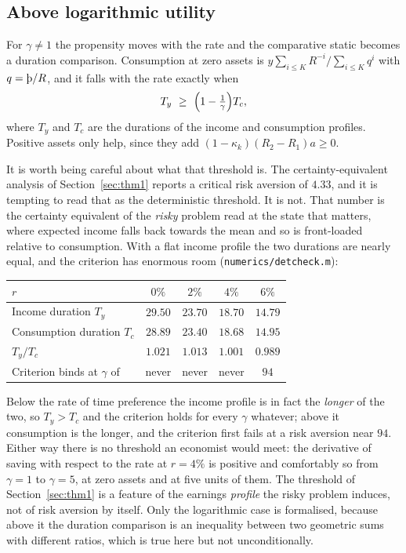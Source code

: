 \subsection{Above logarithmic utility}

For $\gamma\ne1$ the propensity moves with the rate and the comparative static becomes a duration
comparison. Consumption at zero assets is $y\sum_{i\le K}R^{-i}\big/\sum_{i\le K}q^i$ with
$q=\Thorn/R$, and it falls with the rate exactly when
\[
  T_y\ \ge\ \Bigl(1-\tfrac1\gamma\Bigr)T_c ,
\]
where $T_y$ and $T_c$ are the durations of the income and consumption profiles. Positive assets
only help, since they add $(1-\kappa_k)(R_2-R_1)a\ge0$.

It is worth being careful about what that threshold is. The certainty-equivalent analysis of
Section~\ref{sec:thm1} reports a critical risk aversion of $4.33$, and it is tempting to read that
as the deterministic threshold. It is not. That number is the certainty equivalent of the
\emph{risky} problem read at the state that matters, where expected income falls back towards the
mean and so is front-loaded relative to consumption. With a flat income profile the two durations
are nearly equal, and the criterion has enormous room (\texttt{numerics/detcheck.m}):

\begingroup\small
\begin{center}
\begin{tabular}{@{}lcccc@{}}
\toprule
$r$ & $0\%$ & $2\%$ & $4\%$ & $6\%$\\
\midrule
Income duration $T_y$ & $29.50$ & $23.70$ & $18.70$ & $14.79$\\
Consumption duration $T_c$ & $28.89$ & $23.40$ & $18.68$ & $14.95$\\
$T_y/T_c$ & $1.021$ & $1.013$ & $1.001$ & $0.989$\\
Criterion binds at $\gamma$ of & never & never & never & $94$\\
\bottomrule
\end{tabular}
\end{center}
\endgroup

Below the rate of time preference the income profile is in fact the \emph{longer} of the two, so
$T_y>T_c$ and the criterion holds for every $\gamma$ whatever; above it consumption is the longer,
and the criterion first fails at a risk aversion near $94$. Either way there is no threshold an
economist would meet: the derivative of saving with respect to the rate at $r=4\%$ is positive
and comfortably so from $\gamma=1$ to $\gamma=5$, at zero assets and at five units of them. The
threshold of
Section~\ref{sec:thm1} is a feature of the earnings \emph{profile} the risky problem induces, not
of risk aversion by itself. Only the logarithmic case is formalised, because above it the duration
comparison is an inequality between two geometric sums with different ratios, which is true here
but not unconditionally.
